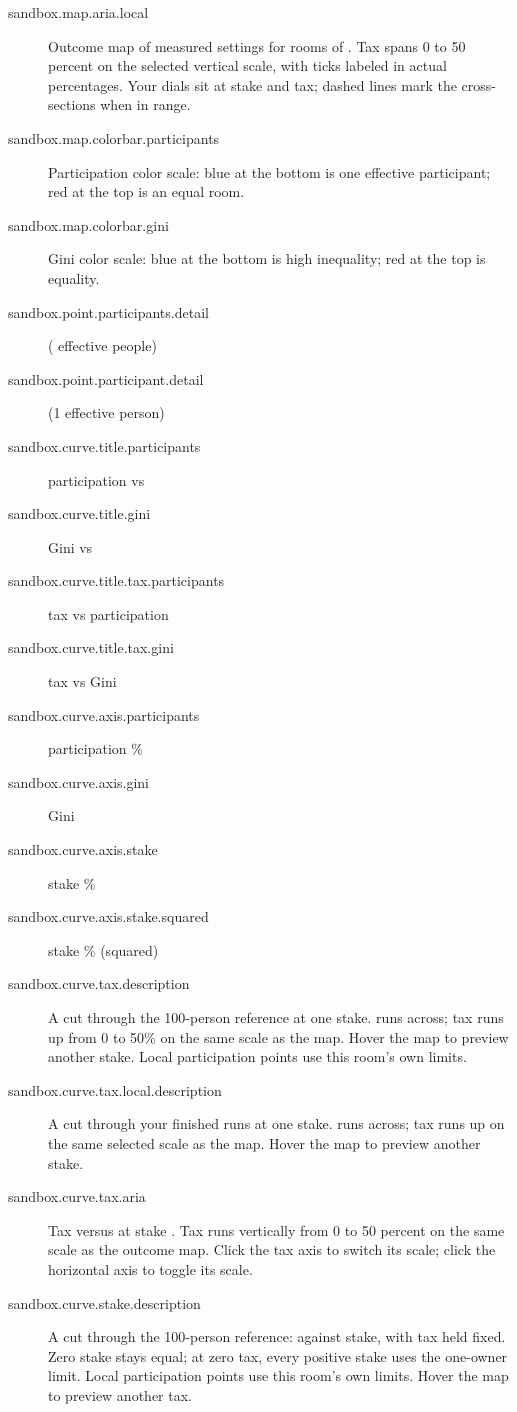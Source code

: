 \begin{description}
  \item[sandbox.map.aria.local] Outcome map of  measured  settings for rooms of . Tax spans 0 to 50 percent on the selected vertical scale, with ticks labeled in actual percentages. Your dials sit at  stake and  tax; dashed lines mark the cross-sections when in range.
  \item[sandbox.map.colorbar.participants] Participation color scale: blue at the bottom is one effective participant; red at the top is an equal room.
  \item[sandbox.map.colorbar.gini] Gini color scale: blue at the bottom is high inequality; red at the top is equality.
  \item[sandbox.point.participants.detail] ( effective people)
  \item[sandbox.point.participant.detail] (1 effective person)
  \item[sandbox.curve.title.participants] participation vs 
  \item[sandbox.curve.title.gini] Gini vs 
  \item[sandbox.curve.title.tax.participants] tax vs participation
  \item[sandbox.curve.title.tax.gini] tax vs Gini
  \item[sandbox.curve.axis.participants] participation \%
  \item[sandbox.curve.axis.gini] Gini
  \item[sandbox.curve.axis.stake] stake \%
  \item[sandbox.curve.axis.stake.squared] stake \% (squared)
  \item[sandbox.curve.tax.description] A cut through the 100-person reference at one stake.  runs across; tax runs up from 0 to 50\% on the same scale as the map. Hover the map to preview another stake. Local participation points use this room's own limits.
  \item[sandbox.curve.tax.local.description] A cut through your finished runs at one stake.  runs across; tax runs up on the same selected scale as the map. Hover the map to preview another stake.
  \item[sandbox.curve.tax.aria] Tax versus  at stake . Tax runs vertically from 0 to 50 percent on the same scale as the outcome map. Click the tax axis to switch its scale; click the horizontal axis to toggle its scale.
  \item[sandbox.curve.stake.description] A cut through the 100-person reference:  against stake, with tax held fixed. Zero stake stays equal; at zero tax, every positive stake uses the one-owner limit. Local participation points use this room's own limits. Hover the map to preview another tax.

\end{description}
